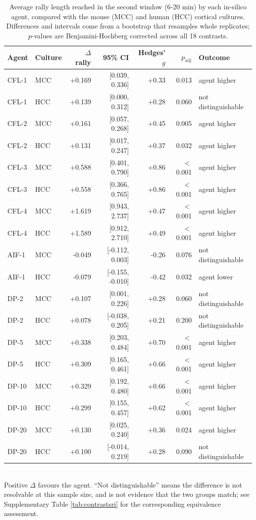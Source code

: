 \begin{table}[ht]
\centering
\small
\caption{Average rally length reached in the second window (6-20 min) by each in-silico agent, compared with the mouse (MCC) and human (HCC) cortical cultures. Differences and intervals come from a bootstrap that resamples whole replicates; $p$-values are Benjamini-Hochberg corrected across all 18 contrasts.}
\label{tab:contrasts}
\begin{tabular}{llrrrrl}
\toprule
Agent & Culture & $\Delta$ rally & 95\% CI & Hedges' $g$ & $p_{\mathrm{adj}}$ & Outcome \\
\midrule
CFL-1 & MCC & +0.169 & [0.039, 0.336] & +0.33 & 0.013 & agent higher \\
CFL-1 & HCC & +0.139 & [0.000, 0.312] & +0.28 & 0.060 & not distinguishable \\
CFL-2 & MCC & +0.161 & [0.057, 0.268] & +0.45 & 0.005 & agent higher \\
CFL-2 & HCC & +0.131 & [0.017, 0.247] & +0.37 & 0.032 & agent higher \\
CFL-3 & MCC & +0.588 & [0.401, 0.790] & +0.86 & $<$0.001 & agent higher \\
CFL-3 & HCC & +0.558 & [0.366, 0.765] & +0.86 & $<$0.001 & agent higher \\
CFL-4 & MCC & +1.619 & [0.943, 2.737] & +0.47 & $<$0.001 & agent higher \\
CFL-4 & HCC & +1.589 & [0.912, 2.710] & +0.49 & $<$0.001 & agent higher \\
AIF-1 & MCC & -0.049 & [-0.112, 0.003] & -0.26 & 0.076 & not distinguishable \\
AIF-1 & HCC & -0.079 & [-0.155, -0.010] & -0.42 & 0.032 & agent lower \\
DP-2 & MCC & +0.107 & [0.001, 0.226] & +0.28 & 0.060 & not distinguishable \\
DP-2 & HCC & +0.078 & [-0.038, 0.205] & +0.21 & 0.200 & not distinguishable \\
DP-5 & MCC & +0.338 & [0.203, 0.484] & +0.70 & $<$0.001 & agent higher \\
DP-5 & HCC & +0.309 & [0.165, 0.461] & +0.66 & $<$0.001 & agent higher \\
DP-10 & MCC & +0.329 & [0.192, 0.480] & +0.66 & $<$0.001 & agent higher \\
DP-10 & HCC & +0.299 & [0.155, 0.457] & +0.62 & $<$0.001 & agent higher \\
DP-20 & MCC & +0.130 & [0.025, 0.240] & +0.36 & 0.024 & agent higher \\
DP-20 & HCC & +0.100 & [-0.014, 0.219] & +0.28 & 0.090 & not distinguishable \\
\bottomrule
\end{tabular}
\\[4pt]\footnotesize{Positive $\Delta$ favours the agent. ``Not distinguishable'' means the difference is not resolvable at this sample size, and is not evidence that the two groups match; see Supplementary Table \mbox{\ref{tab:contrastsri}} for the corresponding equivalence assessment.}
\end{table}
